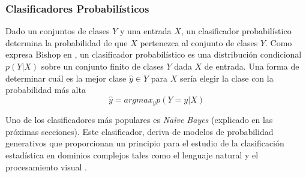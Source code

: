 \subsubsection{Clasificadores Probabilísticos}

	Dado un conjuntos de clases $Y$ y una entrada $X$, un clasificador probabilístico determina la probabilidad de que $X$ pertenezca al conjunto de clases $Y$. Como expresa Bishop en \cite{Bis07}, un clasificador probabilístico es una distribución condicional $p(Y|X)$ sobre un conjunto finito de clases $Y$ dada $X$ de entrada. Una forma de determinar cuál es la mejor clase $\hat{y} \in Y$ para $X$ sería elegir la clase con la probabilidad más alta
	$$\hat{y} = argmax_{y}p(Y=y|X) $$
	
	Uno de los clasificadores más populares es \textit{Na\"{i}ve Bayes} (explicado en las próximas secciones). Este clasificador, deriva de modelos de probabilidad generativos que proporcionan un principio para el estudio de la clasificación estadística en dominios complejos tales como el lenguaje natural y el procesamiento visual \cite{GargRo01}.
